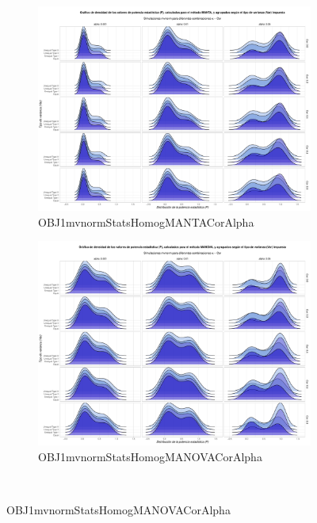 \documentclass[IB,BIB]{TFUOC}%
\begin{document}
\begin{figure}
\centering
\begin{subfigure}{0.49\textwidth}
\centering
\includegraphics[width = \textwidth]{OBJ1mvnormStatsHomogMANTACorAlpha.pdf}
\caption{OBJ1mvnormStatsHomogMANTACorAlpha}
\label{fig:OBJ1mvnormStatsHomogMANTACorAlpha}
\end{subfigure}
\begin{subfigure}{0.49\textwidth}
\centering
\includegraphics[width = \textwidth]{OBJ1mvnormStatsHomogMANOVACorAlpha.pdf}
\caption{OBJ1mvnormStatsHomogMANOVACorAlpha}
\label{fig:OBJ1mvnormStatsHomogMANOVACorAlpha}
\end{subfigure}
\\

\end{figure}
\end{document}
